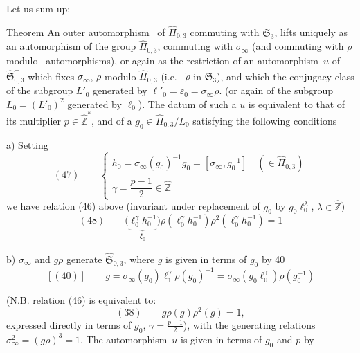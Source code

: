 
Let us sum up:

\uline{Theorem} An outer automorphism\  of
$\widehat{\Pi}_{0,3}$ commuting with
$\mathfrak S_3$, lifts uniquely as an automorphism
of the group  $\widehat{\Pi}_{0,3}$, commuting with
$\sigma_\infty$ (and commuting with $\rho$ modulo\  automorphisms),
or again as the restriction of an automorphism\ $u$ of
$\widehat{\mathfrak S}_{0,3}^{+}$
which fixes $\sigma_\infty$,  $\rho$ modulo $\widehat{\Pi}_{0,3}$
(i.e.\  $\dot\rho$ in $\mathfrak S_3$),
and which  the conjugacy class of the
 subgroup $L'_0$
 generated by $\ell'_0=\varepsilon_0=\sigma_\infty\rho$.
(or again of the  subgroup $L_0=(L'_0)^2$ generated by $\ell_0$).
The datum of such a $u$ is equivalent to that of its multiplier
$p\in\widehat{\mathbb Z}^{*}$, and of a $g_0\in\widehat{\Pi}_{0,3}/L_0$
satisfying the following conditions

 a) Setting
\[
(47)\qquad
\begin{cases}
h_0=\sigma_\infty(g_0)^{-1}g_0=[\sigma_\infty,g_0^{-1}]
   \quad(\in\widehat{\Pi}_{0,3})\\
\gamma=\dfrac{p-1}{2}\in\widehat{\mathbb Z}
\end{cases}
\]
we have relation (46) above (invariant under replacement of $g_0$ by
$g_0\ell_0^\lambda$, $\lambda\in\widehat{\mathbb Z}$)
\[
(48)\qquad
\bigl(\underbrace{\ell_0^\gamma h_0^{-1}}_{\xi_0}\bigr)
\rho(\ell_0^\gamma h_0^{-1})\rho^2(\ell_0^\gamma h_0^{-1})=1
\]

 b) $\sigma_\infty$ and $g\rho$ generate 
$\widehat{\mathfrak S}_{0,3}^{+}$,
where $g$ is given in terms of $g_0$ by 40
\[
[(40)]\qquad
g=\sigma_\infty(g_0)\ell_1^\gamma\rho(g_0)^{-1}
=\sigma_\infty(g_0\ell_0^\gamma)\rho(g_0^{-1})
\]

(\uline{N.B.} relation (46) is equivalent to:
\[
(38)\qquad g\rho(g)\rho^2(g)=1,
\]
expressed directly in terms of $g_0$, $\gamma=\frac{p-1}{2}$),
with the generating relations $\sigma_\infty^2=(g\rho)^3=1$.
The automorphism\ $u$ is given in terms of $g_0$ and $p$ by

